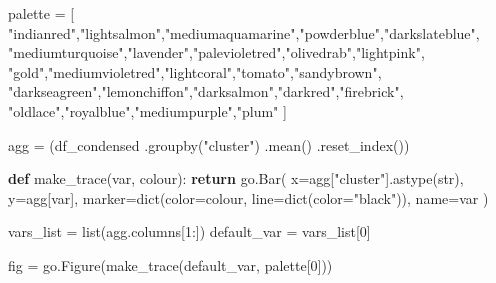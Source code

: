 \documentclass[
  letterpaper,
  DIV=11,
  numbers=noendperiod]{scrreprt}
\newenvironment{Shaded}{\begin{snugshade}}{\end{snugshade}}
\newcommand{\BuiltInTok}[1]{\textcolor[rgb]{0.00,0.23,0.31}{#1}}
\newcommand{\ControlFlowTok}[1]{\textcolor[rgb]{0.00,0.23,0.31}{\textbf{#1}}}
\newcommand{\DecValTok}[1]{\textcolor[rgb]{0.68,0.00,0.00}{#1}}
\newcommand{\KeywordTok}[1]{\textcolor[rgb]{0.00,0.23,0.31}{\textbf{#1}}}
\newcommand{\NormalTok}[1]{\textcolor[rgb]{0.00,0.23,0.31}{#1}}
\newcommand{\OperatorTok}[1]{\textcolor[rgb]{0.37,0.37,0.37}{#1}}
\newcommand{\StringTok}[1]{\textcolor[rgb]{0.13,0.47,0.30}{#1}}
\begin{document}
\begin{Shaded}
\begin{Highlighting}[]
\NormalTok{palette }\OperatorTok{=}\NormalTok{ [}
    \StringTok{"indianred"}\NormalTok{,}\StringTok{"lightsalmon"}\NormalTok{,}\StringTok{"mediumaquamarine"}\NormalTok{,}\StringTok{"powderblue"}\NormalTok{,}\StringTok{"darkslateblue"}\NormalTok{,}
    \StringTok{"mediumturquoise"}\NormalTok{,}\StringTok{"lavender"}\NormalTok{,}\StringTok{"palevioletred"}\NormalTok{,}\StringTok{"olivedrab"}\NormalTok{,}\StringTok{"lightpink"}\NormalTok{,}
    \StringTok{"gold"}\NormalTok{,}\StringTok{"mediumvioletred"}\NormalTok{,}\StringTok{"lightcoral"}\NormalTok{,}\StringTok{"tomato"}\NormalTok{,}\StringTok{"sandybrown"}\NormalTok{,}
    \StringTok{"darkseagreen"}\NormalTok{,}\StringTok{"lemonchiffon"}\NormalTok{,}\StringTok{"darksalmon"}\NormalTok{,}\StringTok{"darkred"}\NormalTok{,}\StringTok{"firebrick"}\NormalTok{,}
    \StringTok{"oldlace"}\NormalTok{,}\StringTok{"royalblue"}\NormalTok{,}\StringTok{"mediumpurple"}\NormalTok{,}\StringTok{"plum"}
\NormalTok{]}

\NormalTok{agg }\OperatorTok{=}\NormalTok{ (df\_condensed}
\NormalTok{       .groupby(}\StringTok{"cluster"}\NormalTok{)}
\NormalTok{       .mean()}
\NormalTok{       .reset\_index())}


\KeywordTok{def}\NormalTok{ make\_trace(var, colour):}
    \ControlFlowTok{return}\NormalTok{ go.Bar(}
\NormalTok{        x}\OperatorTok{=}\NormalTok{agg[}\StringTok{"cluster"}\NormalTok{].astype(}\BuiltInTok{str}\NormalTok{),}
\NormalTok{        y}\OperatorTok{=}\NormalTok{agg[var],}
\NormalTok{        marker}\OperatorTok{=}\BuiltInTok{dict}\NormalTok{(color}\OperatorTok{=}\NormalTok{colour, line}\OperatorTok{=}\BuiltInTok{dict}\NormalTok{(color}\OperatorTok{=}\StringTok{"black"}\NormalTok{)),}
\NormalTok{        name}\OperatorTok{=}\NormalTok{var}
\NormalTok{    )}

\NormalTok{vars\_list }\OperatorTok{=} \BuiltInTok{list}\NormalTok{(agg.columns[}\DecValTok{1}\NormalTok{:])}
\NormalTok{default\_var }\OperatorTok{=}\NormalTok{ vars\_list[}\DecValTok{0}\NormalTok{]}

\NormalTok{fig }\OperatorTok{=}\NormalTok{ go.Figure(make\_trace(default\_var, palette[}\DecValTok{0}\NormalTok{]))}


\end{Highlighting}
\end{Shaded}
\end{document}
